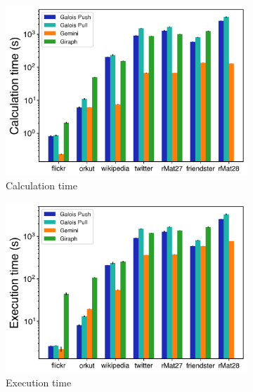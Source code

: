 \documentclass{meetings}
\begin{document}
\begin{figure}
	\hfil
	\begin{subfigure}{0.32\textwidth}
		\includegraphics[width=\linewidth]{../../plots/distributedPR_calcTime.png}
		\caption{Calculation time}
		\label{fig:distributedPR_calc}
	\end{subfigure}
	\hfil
	\begin{subfigure}{0.32\textwidth}
		\includegraphics[width=\linewidth]{../../plots/distributedPR_execTime.png}
		\caption{Execution time}
		\label{fig:distributedPR_exec}
	\end{subfigure}
	\hfil
	\begin{subfigure}{0.32\textwidth}

\end{subfigure}
\end{figure}
\end{document}

